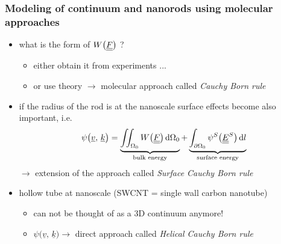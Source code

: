\begin{frame}
  \frametitle{Modeling of continuum and nanorods using molecular approaches}

  \begin{itemize}
    \item what is the form of $W \bigl( \underline{\underline{F}} \bigr)$ ?
      \begin{itemize}
        \item either obtain it from experiments ...
        \item or use theory $\rightarrow$ molecular approach called \textit{Cauchy Born rule}
      \end{itemize}
    \item if the radius of the rod is at the nanoscale surface effects become also important, i.e.
      \begin{displaymath}
        \psi \bigl( \underline{v} , \, \underline{k} \bigr) =
        \underbrace{ \iint_{\Omega_0} W \bigl( \doubleunderline{F} \bigr) \dif \Omega_0 }_{\text{bulk energy}} +
        \underbrace{ \int_{\partial \Omega_0} \psi^S \bigl( \doubleunderline{E}^S \bigr) \dif l }_{\text{surface energy}}
      \end{displaymath}
      \null \quad $\rightarrow$ extension of the approach called \textit{Surface Cauchy Born rule}
    \item hollow tube at nanoscale (SWCNT = single wall carbon nanotube)
      \begin{itemize}
        \item can not be thought of as a 3D continuum anymore!
        \item $\psi \bigl( \underline{v} , \, \underline{k} \bigr) \rightarrow$ direct approach called \textit{Helical Cauchy Born rule}
      \end{itemize}
  \end{itemize}
\end{frame}


